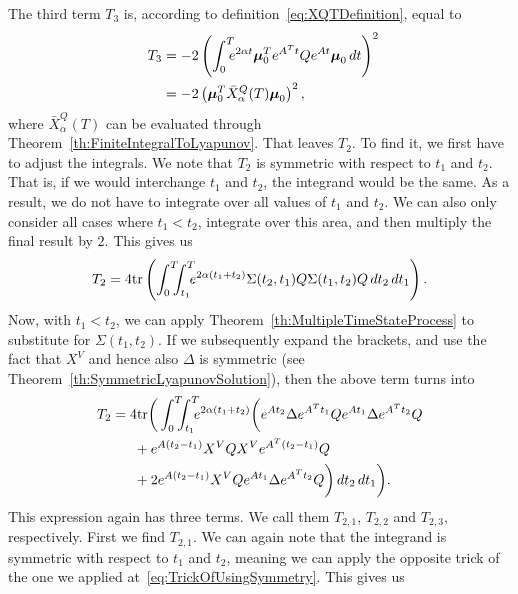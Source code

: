 \documentclass[twocolumn]{autart}
\newcommand{\ve}[1]{{\boldsymbol{#1}}} \newcommand{\tr}{\mbox{tr}} \newcommand{\ex}{\mathds{E}} \newcommand{\va}{\mathds{V}}
\begin{document}
\begin{pf}
The third term $T_3$ is, according to definition~\eqref{eq:XQTDefinition}, equal to
\begin{align}
T_3 & = -2\left(\int_0^T \hspace{-6pt} e^{2\alpha t} \ve{\mu}_0^T e^{A^T t} Q e^{A t} \ve{\mu}_0 \, dt\right)^2 \hspace{-5pt} \nonumber \\
& = -2\left(\ve{\mu}_0^T \bar{X}_\alpha^Q(T) \ve{\mu}_0\right)^2, \label{eq:T3Expression}
\end{align}
where $\bar{X}_\alpha^Q(T)$ can be evaluated through Theorem~\ref{th:FiniteIntegralToLyapunov}. That leaves $T_2$. To find it, we first have to adjust the integrals. We note that $T_2$ is symmetric with respect to $t_1$ and $t_2$. That is, if we would interchange $t_1$ and $t_2$, the integrand would be the same. As a result, we do not have to integrate over all values of $t_1$ and $t_2$. We can also only consider all cases where $t_1 < t_2$, integrate over this area, and then multiply the final result by $2$. This gives us
\begin{equation}
T_2 = 4\tr\left(\int_0^T \hspace{-6pt} \int_{t_1}^T \hspace{-6pt} e^{2\alpha(t_1+t_2)}\Sigma(t_2,t_1) Q \Sigma(t_1,t_2) Q \, dt_2 \, dt_1\right). \label{eq:TrickOfUsingSymmetry}
\end{equation}
Now, with $t_1 < t_2$, we can apply Theorem~\ref{th:MultipleTimeStateProcess} to substitute for $\Sigma(t_1,t_2)$. If we subsequently expand the brackets, and use the fact that $X^V$ and hence also $\Delta$ is symmetric (see Theorem~\ref{th:SymmetricLyapunovSolution}), then the above term turns into
\begin{align}
T_2 & = 4\tr\bigg(\int_0^T \hspace{-6pt} \int_{t_1}^T \hspace{-6pt} e^{2\alpha(t_1+t_2)} \bigg(e^{A t_2} \Delta e^{A^T t_1} Q e^{A t_1} \Delta e^{A^T t_2} Q \nonumber \\
& \hspace{16pt} + e^{A(t_2-t_1)} X^V Q X^V e^{A^T (t_2-t_1)} Q \nonumber \\
& \hspace{16pt} + 2 e^{A (t_2-t_1)} X^V Q e^{At_1} \Delta e^{A^T t_2} Q \bigg) \, dt_2 \, dt_1\bigg).
\end{align}
This expression again has three terms. We call them $T_{2,1}$, $T_{2,2}$ and $T_{2,3}$, respectively. First we find $T_{2,1}$. We can again note that the integrand is symmetric with respect to $t_1$ and $t_2$, meaning we can apply the opposite trick of the one we applied at~\eqref{eq:TrickOfUsingSymmetry}. This gives us

\end{pf}
\end{document}
